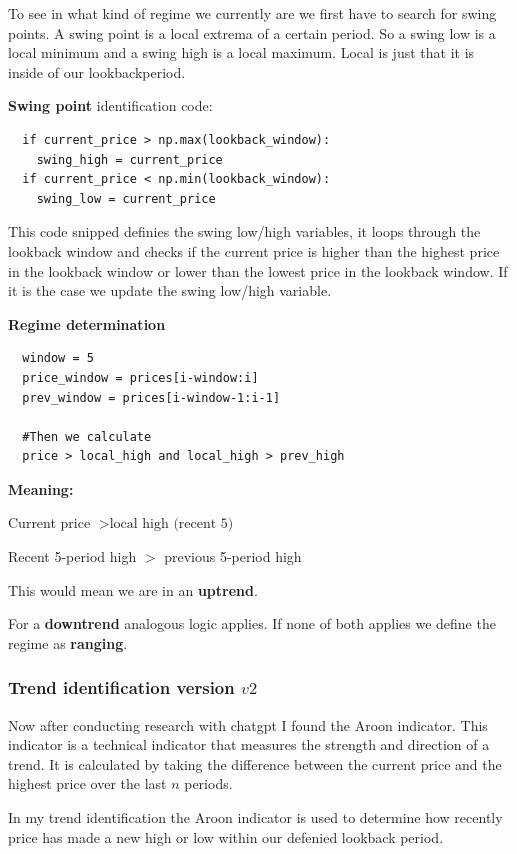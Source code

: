 \documentclass[12pt]{article}
\begin{document}
To see in what kind of regime we currently are we first have to search for swing points. A swing point is a local extrema of a certain period. So a swing low is a local minimum and a swing high is a local maximum. Local is just that it is inside of our lookbackperiod.

\textbf{Swing point} identification code:

\begin{verbatim}
  if current_price > np.max(lookback_window):
    swing_high = current_price
  if current_price < np.min(lookback_window):
    swing_low = current_price
\end{verbatim}

This code snipped definies the swing low/high variables, it loops through the lookback window and checks if the current price is higher than the highest price in the lookback window or lower than the lowest price in the lookback window. If it is the case we update the swing low/high variable.




\textbf{Regime determination} 

\begin{verbatim}
  window = 5
  price_window = prices[i-window:i]
  prev_window = prices[i-window-1:i-1]

  #Then we calculate
  price > local_high and local_high > prev_high
\end{verbatim}

\textbf{Meaning:}

Current price $> \text{local high (recent 5)}$

Recent 5-period high $>$ previous 5-period high

This would mean we are in an \textbf{uptrend}.

For a \textbf{downtrend} analogous logic applies. If none of both applies we define the regime as \textbf{ranging}.



\subsubsection{Trend identification version $v2$}
Now after conducting research with chatgpt I found the Aroon indicator. This indicator is a technical indicator that measures the strength and direction of a trend. It is calculated by taking the difference between the current price and the highest price over the last $n$ periods.

In my trend identification the Aroon indicator is used to determine how recently price has made a new high or low within our defenied lookback period.
\end{document}
